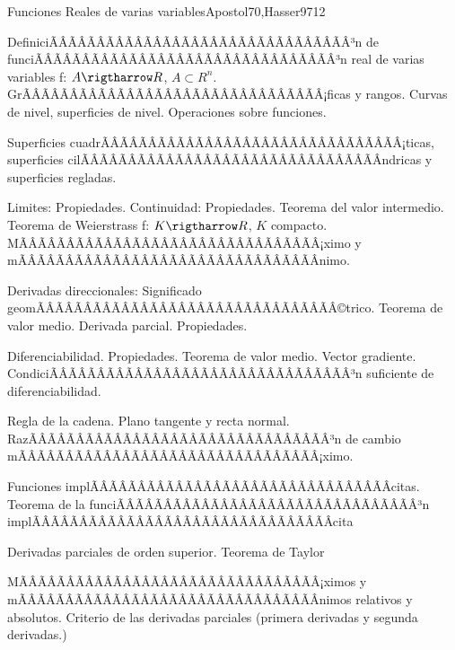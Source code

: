 \begin{sumilla}
\begin{unit}{Funciones Reales de varias variables}{Apostol70,Hasser97}{12}
   \begin{topicos}
	\item  DefiniciÃÂÃÂÃÂÃÂÃÂÃÂÃÂÃÂÃÂÃÂÃÂÃÂÃÂÃÂÃÂÃÂ³n de funciÃÂÃÂÃÂÃÂÃÂÃÂÃÂÃÂÃÂÃÂÃÂÃÂÃÂÃÂÃÂÃÂ³n real de varias variables f: $A \rigtharrow R$, $A \subset R^n$. GrÃÂÃÂÃÂÃÂÃÂÃÂÃÂÃÂÃÂÃÂÃÂÃÂÃÂÃÂÃÂÃÂ¡ficas y rangos. Curvas de nivel, superficies de nivel. Operaciones sobre funciones.
	\item  Superficies cuadrÃÂÃÂÃÂÃÂÃÂÃÂÃÂÃÂÃÂÃÂÃÂÃÂÃÂÃÂÃÂÃÂ¡ticas, superficies cilÃÂÃÂÃÂÃÂÃÂÃÂÃÂÃÂÃÂÃÂÃÂÃÂÃÂÃÂÃÂÃÂ­ndricas y superficies regladas.
	\item  Limites: Propiedades. Continuidad: Propiedades. Teorema del valor intermedio. Teorema de Weierstrass f: $K \rigtharrow R$, $K$ compacto. MÃÂÃÂÃÂÃÂÃÂÃÂÃÂÃÂÃÂÃÂÃÂÃÂÃÂÃÂÃÂÃÂ¡ximo y mÃÂÃÂÃÂÃÂÃÂÃÂÃÂÃÂÃÂÃÂÃÂÃÂÃÂÃÂÃÂÃÂ­nimo.
	\item  Derivadas direccionales: Significado geomÃÂÃÂÃÂÃÂÃÂÃÂÃÂÃÂÃÂÃÂÃÂÃÂÃÂÃÂÃÂÃÂ©trico. Teorema de valor medio. Derivada parcial. Propiedades.
	\item  Diferenciabilidad. Propiedades. Teorema de valor medio. Vector gradiente. CondiciÃÂÃÂÃÂÃÂÃÂÃÂÃÂÃÂÃÂÃÂÃÂÃÂÃÂÃÂÃÂÃÂ³n suficiente de diferenciabilidad.
	\item  Regla de la cadena. Plano tangente y recta normal. RazÃÂÃÂÃÂÃÂÃÂÃÂÃÂÃÂÃÂÃÂÃÂÃÂÃÂÃÂÃÂÃÂ³n de cambio mÃÂÃÂÃÂÃÂÃÂÃÂÃÂÃÂÃÂÃÂÃÂÃÂÃÂÃÂÃÂÃÂ¡ximo.
	\item Funciones implÃÂÃÂÃÂÃÂÃÂÃÂÃÂÃÂÃÂÃÂÃÂÃÂÃÂÃÂÃÂÃÂ­citas. Teorema de la funciÃÂÃÂÃÂÃÂÃÂÃÂÃÂÃÂÃÂÃÂÃÂÃÂÃÂÃÂÃÂÃÂ³n implÃÂÃÂÃÂÃÂÃÂÃÂÃÂÃÂÃÂÃÂÃÂÃÂÃÂÃÂÃÂÃÂ­cita
	\item Derivadas parciales de orden superior. Teorema de Taylor
	\item MÃÂÃÂÃÂÃÂÃÂÃÂÃÂÃÂÃÂÃÂÃÂÃÂÃÂÃÂÃÂÃÂ¡ximos y mÃÂÃÂÃÂÃÂÃÂÃÂÃÂÃÂÃÂÃÂÃÂÃÂÃÂÃÂÃÂÃÂ­nimos relativos y absolutos. Criterio de las derivadas parciales (primera derivadas y segunda derivadas.)
   \end{topicos}


\end{unit}
\end{sumilla}
